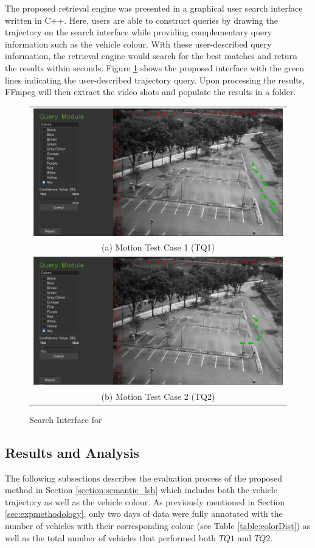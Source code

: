 The proposed retrieval engine was presented in a graphical user search interface written in C++. Here, users are able to construct queries by drawing the trajectory on the search interface while providing complementary query information such as the vehicle colour. With these user-described query information, the retrieval engine would search for the best matches and return the results within seconds. Figure \ref{fig:versionOneInterface} shows the proposed interface with the green lines indicating the user-described trajectory query. Upon processing the results, FFmpeg will then extract the video shots and populate the results in a folder.


\begin{figure}[!htb]
	\centering
	\begin{tabular}{c}
		\includegraphics[width=0.7\linewidth]{image/retrievalOne/test1-8inputs.PNG} \\
		(a) Motion Test Case 1 (TQ1) \\
		\includegraphics[width=0.7\linewidth]{image/retrievalOne/test2-6input.PNG}\\
		(b) Motion Test Case 2 (TQ2)
	\end{tabular}
	\caption{Search Interface for \versionOneRet}
	\label{fig:versionOneInterface}
\end{figure}


\subsection{Results and Analysis}
The following subsections describes the evaluation process of the proposed method in Section \ref{section:semantic_lsh} which includes both the vehicle trajectory as well as the vehicle colour. As previously mentioned in Section \ref{sec:expmethodology}, only two days of data were fully annotated with the number of vehicles with their corresponding colour (see Table \ref{table:colorDist}) as well as the total number of vehicles that performed both $TQ1$ and $TQ2$.

